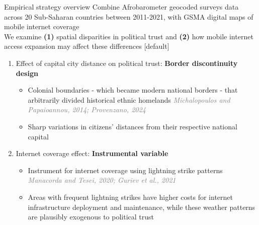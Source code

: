 \documentclass[10pt]{beamer}
\begin{document}
            \begin{frame}{Empirical strategy overview}    
                \centering Combine Afrobarometer geocoded surveys data across 20 Sub-Saharan countries
between 2011-2021, with GSMA digital maps of mobile internet coverage\\\vfill
\vspace{1em}
                \centering We examine \textbf{(1)} spatial disparities in political trust and \textbf{(2)} how mobile internet access expansion may affect these differences \vfill  \pause
                \vspace{1em}
                [default]
                \begin{enumerate}
                    \item Effect of capital city distance on political trust: \textcolor{rougeprez}{\textbf{Border
                    discontinuity design}} \vfill
                    \begin{itemize}
                        \item Colonial boundaries - which became modern national borders
                        - that arbitrarily divided historical ethnic homelands \textcolor{gray}{\textit{Michalopoulos and Papaioannou, 2014; Provenzano, 2024}}\vfill
                        \item Sharp variations in citizens’
                        distances from their respective national capital\vfill  \pause
                    \end{itemize}

                    \item Internet coverage effect: \textcolor{rougeprez}{\textbf{Instrumental variable}}\vfill

                    \begin{itemize}
                    \item Instrument for internet coverage using lightning strike
                    patterns \textcolor{gray}{\textit{Manacorda and Tesei, 2020; Guriev et al., 2021}}\vfill
                    \item Areas with frequent lightning strikes have
                    higher costs for internet infrastructure deployment and maintenance, while these weather
                    patterns are plausibly exogenous to political trust\vfill
                \end{itemize}

                \end{enumerate}
            \end{frame}
\end{document}
